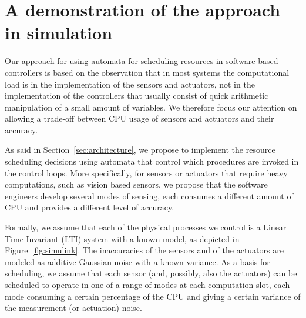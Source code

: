 \documentclass[ twoside, 12pt ]{article}
\begin{document}

\section{A demonstration of the approach in simulation}
\label{sec:simulation}

Our approach for using automata for scheduling resources in software based controllers is based on the observation that in most systems the computational load is in the implementation of the sensors and actuators, not in the implementation of the controllers that usually consist of quick arithmetic manipulation of a small amount of variables. We therefore focus our attention on allowing a trade-off between CPU usage of sensors and actuators and their accuracy. %

As said in Section~\ref{sec:architecture}, we propose to implement the resource scheduling decisions using automata that control which procedures are invoked in the control loops. More specifically, for sensors or actuators that require heavy computations, such as vision based sensors, we propose that the software engineers develop several modes of sensing, each consumes a different amount of CPU and provides a different level of accuracy. 

Formally, we assume that each of the physical processes we control is a Linear Time Invariant (LTI) system with a known model, as depicted in Figure~\ref{fig:simulink}. The inaccuracies of the sensors and of the actuators are modeled as additive Gaussian noise with a known variance. As a basis for scheduling, we assume that each sensor (and, possibly, also the actuators) can be scheduled to operate in one of a range of modes at each computation slot, each mode consuming a certain percentage of the CPU and giving a certain variance of the measurement (or actuation) noise.
\end{document}
